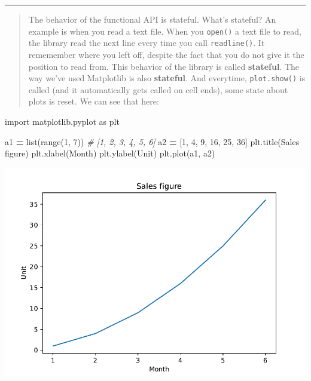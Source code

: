 \documentclass[
]{book}
\newenvironment{Shaded}{\begin{snugshade}}{\end{snugshade}}
\newcommand{\BuiltInTok}[1]{#1}
\newcommand{\CommentTok}[1]{\textcolor[rgb]{0.56,0.35,0.01}{\textit{#1}}}
\newcommand{\DecValTok}[1]{\textcolor[rgb]{0.00,0.00,0.81}{#1}}
\newcommand{\ImportTok}[1]{#1}
\newcommand{\NormalTok}[1]{#1}
\newcommand{\OperatorTok}[1]{\textcolor[rgb]{0.81,0.36,0.00}{\textbf{#1}}}
\newcommand{\StringTok}[1]{\textcolor[rgb]{0.31,0.60,0.02}{#1}}
\theoremstyle{definition}
\theoremstyle{definition}
\theoremstyle{definition}
\theoremstyle{definition}
\theoremstyle{remark}
\begin{document}
\begin{center}\rule{0.5\linewidth}{0.5pt}\end{center}

\begin{quote}
The behavior of the functional API is stateful. What's stateful? An example is when you read a text file. When you \texttt{open()} a text file to read, the library read the next line every time you call \texttt{readline()}. It rememember where you left off, despite the fact that you do not give it the position to read from. This behavior of the library is called \textbf{stateful}.
The way we've used Matplotlib is also \textbf{stateful}. And everytime, \texttt{plot.show()} is called (and it automatically gets called on cell ends), some state about plots is reset.
We can see that here:
\end{quote}

\begin{Shaded}
\begin{Highlighting}[]
\ImportTok{import}\NormalTok{ matplotlib.pyplot }\ImportTok{as}\NormalTok{ plt}

\NormalTok{a1 }\OperatorTok{=} \BuiltInTok{list}\NormalTok{(}\BuiltInTok{range}\NormalTok{(}\DecValTok{1}\NormalTok{, }\DecValTok{7}\NormalTok{)) }\CommentTok{\# [1, 2, 3, 4, 5, 6]}
\NormalTok{a2 }\OperatorTok{=}\NormalTok{ [}\DecValTok{1}\NormalTok{, }\DecValTok{4}\NormalTok{, }\DecValTok{9}\NormalTok{, }\DecValTok{16}\NormalTok{, }\DecValTok{25}\NormalTok{, }\DecValTok{36}\NormalTok{]}
\NormalTok{plt.title(}\StringTok{\textquotesingle{}Sales figure\textquotesingle{}}\NormalTok{)}
\NormalTok{plt.xlabel(}\StringTok{\textquotesingle{}Month\textquotesingle{}}\NormalTok{)}
\NormalTok{plt.ylabel(}\StringTok{\textquotesingle{}Unit\textquotesingle{}}\NormalTok{)}
\NormalTok{plt.plot(a1, a2)}
\end{Highlighting}
\end{Shaded}

\includegraphics{202403181222-MatPlotLib_files/figure-latex/unnamed-chunk-9-7.pdf}
\end{document}
